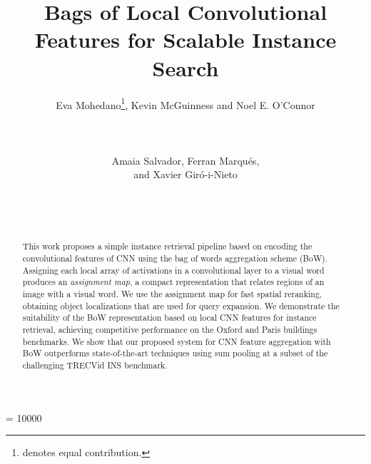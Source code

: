 \documentclass{sig-arxiv}
\newcommand*\samethanks[1][\value{footnote}]{\footnotemark[#1]}
\begin{document}
\widowpenalty = 10000


\title{Bags of Local Convolutional Features for Scalable Instance Search}




\author{
\alignauthor Eva Mohedano\thanks{denotes equal contribution.}, Kevin McGuinness and Noel E. O'Connor \\
 \\
 \\
 \\
\alignauthor Amaia Salvador\samethanks, Ferran Marqu\'es, \\and  Xavier Gir\'o-i-Nieto\\
 \\
 \\
 \\
} 


\maketitle
\begin{abstract}

This work proposes a simple instance retrieval pipeline based on encoding the convolutional features of CNN using the bag of words aggregation scheme (BoW). Assigning each local array of activations in a convolutional layer to a visual word produces an \textit{assignment map}, a compact representation that relates regions of an image with a visual word. We use the assignment map for fast spatial reranking, obtaining object localizations that are used for query expansion. We demonstrate the suitability of the BoW representation based on local CNN features for instance retrieval, achieving competitive performance on the Oxford and Paris buildings benchmarks. We show that our proposed system for CNN feature aggregation with BoW outperforms state-of-the-art techniques using sum pooling at a subset of the challenging TRECVid INS benchmark.
\end{abstract}






\end{document}
